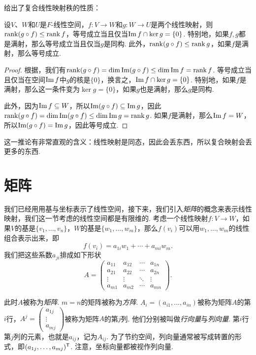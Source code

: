  给出了复合线性映射秩的性质：
\begin{corollary}\label{cor:rank-composition}
设$V$、$W$和$U$是$F$-线性空间，$f:V\to W$和$g:W\to U$是两个线性映射，则$\operatorname*{rank} (g\circ f)\leq \operatorname*{rank} f$，等号成立当且仅当$\operatorname*{Im} f\cap \ker g=\{0\}$. 特别地，如果$f,g$都是满射，那么等号成立当且仅当$g$是同构. 此外，$\operatorname*{rank} (g\circ f)\leq \operatorname*{rank} g$，如果$f$是满射，那么等号成立. 
\end{corollary}
\begin{proof}
    根据，我们有$\operatorname*{rank} (g\circ f)=\dim\operatorname*{Im} (g\circ f)\leq \dim \operatorname*{Im} f=\operatorname*{rank} f$. 等号成立当且仅当在空间$\operatorname*{Im} f$中$g$的核是$\{0\}$，换言之，$\operatorname*{Im} f\cap \ker g=\{0\}$. 特别地，如果$f$是满射，那么这一条件变为$\ker g=\{0\}$，如果$g$也是满射，那么$g$是同构. 
    
    此外，因为$\operatorname*{Im} f\subseteq W$，所以$\operatorname*{Im} (g\circ f)\subseteq \operatorname*{Im} g$，因此$\operatorname*{rank} (g\circ f)=\dim\operatorname*{Im} (g\circ f)\leq \dim \operatorname*{Im} g=\operatorname*{rank} g$. 如果$f$是满射，那么$\operatorname*{Im} f=W$，所以$\operatorname*{Im} (g\circ f)=\operatorname*{Im} g$，因此等号成立. 
\end{proof}

这一推论有非常直观的含义：线性映射是同态，因此会丢东西，所以复合映射会丢更多的东西. 

\section{矩阵}\label{sec:matrix}

我们已经用用基与坐标表示了线性空间，接下来，我们引入\emph{矩阵}的概念来表示线性映射，我们这一节考虑的线性空间都是有限维的. 考虑一个线性映射$f:V\to W$，如果$V$的基是$\{v_1,\dots,v_n\}$，$W$的基是$\{w_1,\dots,w_m\}$，那么$f(v_i)$可以用$w_1,\dots,w_m$的线性组合表示出来，即
\[f(v_i)=a_{1i}w_1+\cdots+a_{mi}w_m.\]
我们把这些系数$a_{ji}$排成如下形状
\[A=\begin{pmatrix}
a_{11}&a_{12}&\cdots&a_{1n}\\
a_{21}&a_{22}&\cdots&a_{2n}\\
\vdots&\vdots&\ddots&\vdots\\
a_{m1}&a_{m2}&\cdots&a_{mn}
\end{pmatrix}.\]

此时$A$被称为\emph{矩阵}. $m=n$的矩阵被称为\emph{方阵}. $A_i=(a_{i1},\dots,a_{in})$被称为矩阵$A$的第$i$行，$A^j=\begin{pmatrix}a_{1j}\\\vdots\\a_{mj}\end{pmatrix}$被称为矩阵$A$的第$j$列. 他们分别被叫做\emph{行向量}与\emph{列向量}. 第$i$行第$j$列的元素，也就是$a_{ij}$，记为$A_{ij}$. 为了节约空间，列向量通常被写成转置的形式，即$(a_{1j},\dots,a_{mj})^{\mathsf{T}}$. 注意，坐标向量都被视作列向量. 

